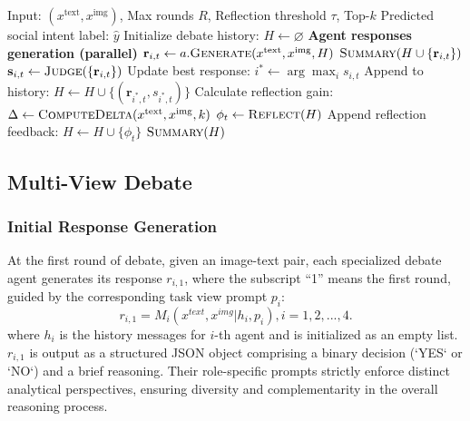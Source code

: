 \documentclass[letterpaper]{article} %
\begin{document}
\begin{algorithm}[t]
\caption{ Reflection-Gated Multi-View Debate}
\label{alg:mv-debate}
\begin{algorithmic}[1]
    \REQUIRE Input: $(x^{\text{text}}, x^{\text{img}})$, Max rounds $R$, Reflection threshold $\tau$, Top-$k$
    \ENSURE Predicted social intent label: $\hat{y}$
    \STATE Initialize debate history: $H \gets \varnothing$
        \STATE \textbf{Agent responses generation (parallel)}
            \STATE $\mathbf{r}_{i,t} \gets a.\textsc{Generate}(x^{\text{text}}, x^{\text{img}}, H)$
        \ENDFOR
            \RETURN $\textsc{Summary}(H \cup \{\mathbf{r}_{i,t}\})$
        \ENDIF
        \STATE $\mathbf{s}_{i,t} \gets \textsc{Judge}(\{\mathbf{r}_{i,t}\})$ 
        \STATE Update best response: $i^* \gets \arg\max_i s_{i,t}$
        \STATE Append to history: $H \gets H \cup \{(\mathbf{r}_{i^*,t}, s_{i^*,t})\}$
        \STATE Calculate reflection gain:
        \STATE \hspace{1em} $\Delta \gets \textsc{ComputeDelta}(x^{\text{text}}, x^{\text{img}}, k)$
        \IF{$\Delta \geq \tau$} 
            \STATE $\phi_{t} \gets \textsc{Reflect}(H)$
            \STATE Append reflection feedback:
            \STATE  $H \gets H \cup \{\phi_{t}\}$
        \ENDIF
    \ENDFOR
    \RETURN $\textsc{Summary}(H)$
\end{algorithmic}
\end{algorithm}





\subsection{Multi-View Debate}

\subsubsection{Initial Response Generation}
At the first round of debate, given an image-text pair, each specialized debate agent generates its response  $r_{i,1}$, where the subscript “1” means the first round, guided by the corresponding task view prompt $p_i$:
\begin{equation}
    r_{i,1} = M_i(x^{text}, x^{img}|h_i, p_i), i = 1,2,...,4.
\end{equation}
where $h_i$ is the history messages for $i$-th agent and is 
initialized as an empty list. $r_{i,1}$ is output as a structured JSON object comprising a binary decision (`YES` or `NO`) and a brief reasoning. Their role-specific prompts strictly enforce distinct analytical perspectives, ensuring diversity and complementarity in the overall reasoning process.
\end{document}
